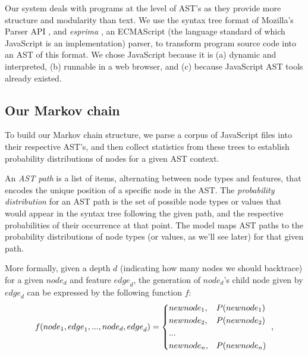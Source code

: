 \documentclass[titlepage]{article}
\begin{document}



Our system deals with programs at the level of AST's as they provide more structure and modularity than text.
We use the syntax tree format of Mozilla's Parser API \cite{parser api}, and \emph{esprima} \cite{esprima}, an ECMAScript
(the language standard of which JavaScript is an implementation)
parser, to transform program source code into an AST of this format. We chose JavaScript because it is (a) dynamic and interpreted, (b) runnable in a web browser, and (c) because JavaScript AST tools already existed.

\subsection{Our Markov chain}

To build our Markov chain structure, we parse a corpus of JavaScript files into their
respective AST's, and then collect statistics from these trees to establish probability distributions of nodes for a given AST context. 

An \emph{AST path} is a list of items, alternating between node types and features, that encodes the unique position of a 
specific node in the AST. The \emph{probability distribution} for an AST path is the set of possible node types or values that would appear in the
syntax tree following the given path, and the respective probabilities of their
occurrence at that point. The model maps AST paths to the probability distributions of node types (or values, as we'll see later) for that given
path. 

More formally, given a depth $d$ (indicating how many nodes we should backtrace) for a given
${node}_d$ and feature ${edge}_d$, the generation of ${node}_d$'s child node given by
 ${edge}_d$ can be expressed by the following function $f$: \begin{align*}
f({node}_1, {edge}_1, ..., {node}_{d}, {edge}_{d}) = \begin{dcases*}
		{newnode_1},	&	$P({newnode_1})$ \\
		{newnode_2},	&	$P({newnode_2})$ \\
		...\\
		{newnode_n},    &   $P({newnode_n})$ \\
	\end{dcases*},
\end{align*}
\end{document}
